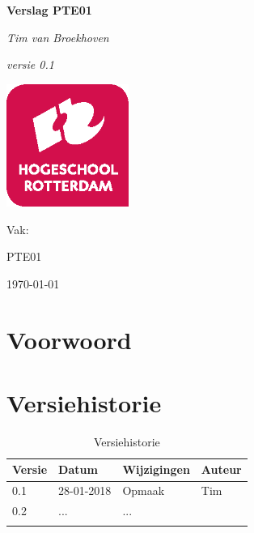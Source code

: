 \documentclass[11pt,a4paper]{article}
\def\auteur{Tim van Broekhoven}
\def\titel{Verslag PTE01}
\def\datum{\today}
\def\versie{0.1}
\def\subtitel{}
\begin{document}
	
	\begin{titlepage}
		
		\centering
		{\huge\bfseries \titel \par}
		{\huge\itshape \subtitel \par}
		\vspace{1cm}
		{\Large\itshape \auteur \par}
		\vspace{1cm}
		{\Large\itshape versie \versie\par}	
		\vfill
		\includegraphics[width=0.30\textwidth]{hr-logo}\par\vspace{1cm}
		Vak:\par
		PTE01
		
		\vfill
		{\large \datum \par}
	\end{titlepage}

	\section{Voorwoord}
	
	\clearpage
	
	\tableofcontents
	
	\clearpage
	
	\listoffigures
	
	\clearpage
	\listoftables
	
	\clearpage
	
	\section{Versiehistorie}
	\begin{table}[H]
		\centering
		\label{Versiehistorie}
		\begin{tabular}{|p{1cm}|p{2cm}|p{6cm}|p{2cm}|}
			\hline
			\rowcolor[HTML]{FFCC67}
			\textbf{Versie} & \textbf{Datum} & \textbf{Wijzigingen} & \textbf{Auteur} \\ \hline
			0.1    & 28-01-2018 & Opmaak    & Tim \\ \hline
			0.2	   & ...		& ...  	&  \\ \hline
			&       &             &        \\ \hline
		\end{tabular}
		\caption {Versiehistorie} \label{tab:title} 
	\end{table}	
\end{document}
